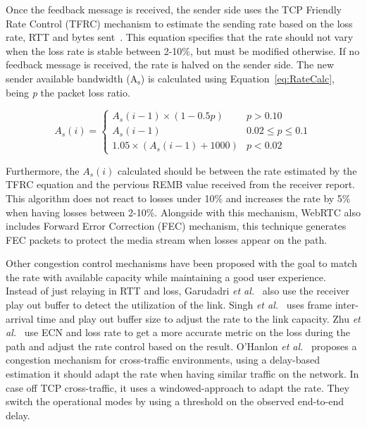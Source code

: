 Once the feedback message is received, the sender side uses the TCP Friendly Rate Control (TFRC)  mechanism to estimate the sending rate based on the loss rate, RTT and bytes sent~\cite{tfrc}. This equation specifies that the rate should not vary when the loss rate is stable between 2-10\%, but must be modified otherwise. If no feedback message is received, the rate is halved on the sender side. The new sender available bandwidth (A$_{\textrm{s}}$) is calculated using Equation~\ref{eq:RateCalc}, being {\it p} the packet loss ratio.

\begin{equation}
 A_s(i) =
  \begin{cases}
   A_s(i-1)\times(1-0.5p) & p>0.10\\
   A_s(i-1) & 0.02\leq p\leq 0.1 \\
   1.05\times(A_s(i-1)+1000) & p < 0.02
  \end{cases}
  \label{eq:RateCalc}
\end{equation}

Furthermore, the $A_s(i)$ calculated should be between the rate estimated by the TFRC equation and the pervious REMB value received from the receiver report. This algorithm does not react to losses under 10\% and increases the rate by 5\% when having losses between 2-10\%. Alongside with this mechanism, WebRTC also includes Forward Error Correction (FEC)  mechanism, this technique generates FEC packets to protect the media stream when losses appear on the path.

Other congestion control mechanisms have been proposed with the goal to match the rate with available capacity while maintaining a good user experience. Instead of just relaying in RTT and loss, Garudadri {\it et al.}~\cite{garudadri} also use the receiver play out buffer to detect the utilization of the link. Singh {\it et al.}~\cite{singhPaper} uses frame inter-arrival time and play out buffer size to adjust the rate to the link capacity. Zhu {\it et al.}~\cite{zhu} use ECN and loss rate to get a more accurate metric on the loss during the path and adjust the rate control based on the result. O'Hanlon {\it et al.}~\cite{hanlon} proposes a congestion mechanism for cross-traffic environments, using a delay-based estimation it should adapt the rate when having similar traffic on the network. In case off TCP cross-traffic, it uses a windowed-approach to adapt the rate. They switch the operational modes by using a threshold on the observed end-to-end delay.


